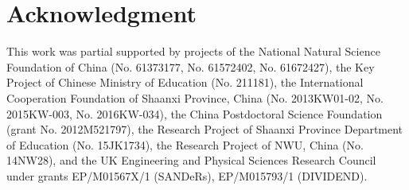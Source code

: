 \documentclass[preprint,12pt,3p]{elsarticle}
\begin{document}
\section*{Acknowledgment}
This work was partial supported by projects of the National Natural Science Foundation of China
(No. 61373177, No. 61572402, No. 61672427),
the Key Project of Chinese Ministry of Education (No. 211181),
the International Cooperation Foundation of Shaanxi Province, China (No. 2013KW01-02, No. 2015KW-003, No. 2016KW-034),
the China Postdoctoral Science Foundation (grant No. 2012M521797),
the Research Project of Shaanxi Province Department of Education (No. 15JK1734),
the Research Project of NWU, China (No. 14NW28),
and the UK Engineering and Physical Sciences Research Council under grants EP/M01567X/1 (SANDeRs), EP/M015793/1 (DIVIDEND).








% 
% 
% 
% 
% 
% 
% 
% 
% 
% 
% 
% 


\end{document}
